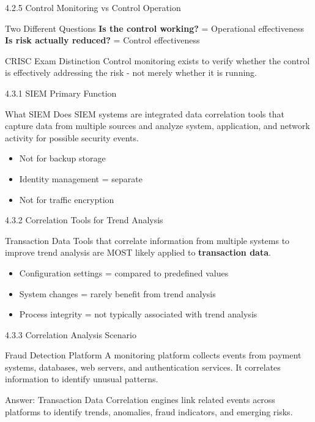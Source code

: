 \documentclass{beamer}
\begin{document}
	\begin{frame}{4.2.5 Control Monitoring vs Control Operation}
		\begin{block}{Two Different Questions}
			\textbf{Is the control working?} = Operational effectiveness \\
			\textbf{Is risk actually reduced?} = Control effectiveness
		\end{block}
		\begin{alertblock}{CRISC Exam Distinction}
			Control monitoring exists to verify whether the control is effectively addressing the risk - not merely whether it is running.
		\end{alertblock}
	\end{frame}
	
	\begin{frame}{4.3.1 SIEM Primary Function}
		\begin{block}{What SIEM Does}
			SIEM systems are integrated data correlation tools that capture data from multiple sources and analyze system, application, and network activity for possible security events.
		\end{block}
		\begin{itemize}
			\item Not for backup storage
			\item Identity management = separate
			\item Not for traffic encryption
		\end{itemize}
	\end{frame}
	
	\begin{frame}{4.3.2 Correlation Tools for Trend Analysis}
		\begin{block}{Transaction Data}
			Tools that correlate information from multiple systems to improve trend analysis are MOST likely applied to \textbf{transaction data}.
		\end{block}
		\begin{itemize}
			\item Configuration settings = compared to predefined values
			\item System changes = rarely benefit from trend analysis
			\item Process integrity = not typically associated with trend analysis
		\end{itemize}
	\end{frame}
	
	\begin{frame}{4.3.3 Correlation Analysis Scenario}
		\begin{block}{Fraud Detection Platform}
			A monitoring platform collects events from payment systems, databases, web servers, and authentication services. It correlates information to identify unusual patterns.
		\end{block}
		\begin{exampleblock}{Answer: Transaction Data}
			Correlation engines link related events across platforms to identify trends, anomalies, fraud indicators, and emerging risks.
		\end{exampleblock}
	\end{frame}
	
\end{document}

